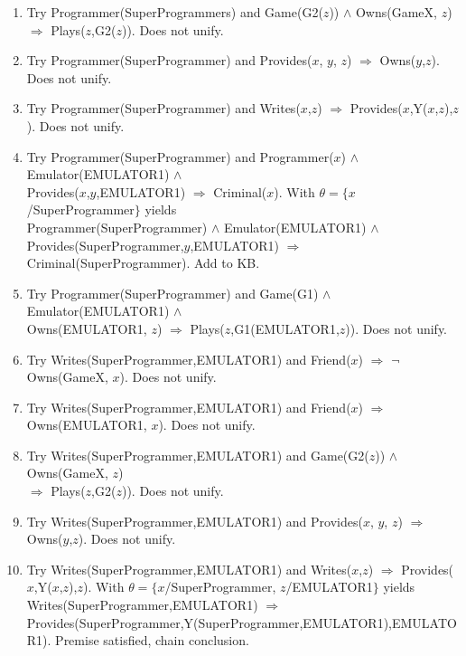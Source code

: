 \documentclass[10pt]{article}
\begin{document}
\begin{enumerate}
\begin{enumerate}
\begin{enumerate}
    \item Try Programmer(SuperProgrammers) and 
          Game(G2($z$)) $\land$ Owns(GameX, $z$) 
            $\Rightarrow$ Plays($z$,G2($z$)). Does not unify.
    \item Try Programmer(SuperProgrammer) and 
            Provides($x$, $y$, $z$) $\Rightarrow$ Owns($y$,$z$). Does not unify.
    \item Try Programmer(SuperProgrammer) and 
          Writes($x$,$z$) $\Rightarrow$ Provides($x$,Y($x$,$z$),$z$).  
          Does not unify.
    \item Try Programmer(SuperProgrammer) and 
          Programmer($x$) $\land$ Emulator(EMULATOR1) $\land$ \\
            Provides($x$,$y$,EMULATOR1) $\Rightarrow$ Criminal($x$). With
          $\theta = \{x$/SuperProgrammer$\}$ yields \\
          Programmer(SuperProgrammer) $\land$ Emulator(EMULATOR1) $\land$ \\
            Provides(SuperProgrammer,$y$,EMULATOR1) $\Rightarrow$ 
            Criminal(SuperProgrammer). Add to KB.
    \item Try Programmer(SuperProgrammer) and 
          Game(G1) $\land$ Emulator(EMULATOR1) $\land$ \\
            Owns(EMULATOR1, $z$) $\Rightarrow$ Plays($z$,G1(EMULATOR1,$z$)).
          Does not unify.
    \item Try Writes(SuperProgrammer,EMULATOR1) and 
          Friend($x$) $\Rightarrow$ $\neg$ Owns(GameX, $x$).  Does not unify.
    \item Try Writes(SuperProgrammer,EMULATOR1) and 
          Friend($x$) $\Rightarrow$ Owns(EMULATOR1, $x$). Does not unify.
    \item Try Writes(SuperProgrammer,EMULATOR1) and 
          Game(G2($z$)) $\land$ Owns(GameX, $z$) \\
            $\Rightarrow$ Plays($z$,G2($z$)). Does not unify.
    \item Try Writes(SuperProgrammer,EMULATOR1) and 
            Provides($x$, $y$, $z$) $\Rightarrow$ Owns($y$,$z$). Does not unify.
    \item Try Writes(SuperProgrammer,EMULATOR1) and 
          Writes($x$,$z$) $\Rightarrow$ Provides($x$,Y($x$,$z$),$z$).  
          With $\theta = \{x$/SuperProgrammer, $z$/EMULATOR1$\}$ yields
          Writes(SuperProgrammer,EMULATOR1) $\Rightarrow$ 
             Provides(SuperProgrammer,Y(SuperProgrammer,EMULATOR1),EMULATOR1).
          Premise satisfied, chain conclusion.

\end{enumerate}
\end{enumerate}
\end{enumerate}
\end{document}
